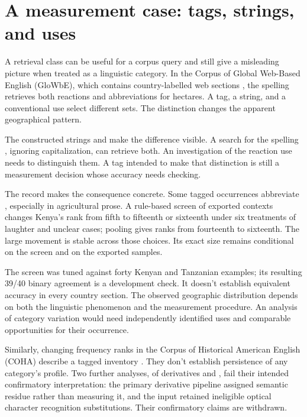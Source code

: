 \documentclass[12pt]{article}
\begin{document}
\section{A measurement case: tags, strings, and uses}\label{sec:evidence}

A retrieval class can be useful for a corpus query and still give
a misleading picture when treated as a linguistic category. In the
Corpus of Global Web-Based English (GloWbE), which contains country-labelled
web sections \citep{daviesfuchs2015}, the spelling  retrieves
both reactions and abbreviations for hectares. A tag, a string, and
a conventional use select different sets. The distinction changes the
apparent geographical pattern.

The constructed strings  and  make the difference visible. A search for the spelling
, ignoring capitalization, can retrieve both. An investigation
of the reaction use needs to distinguish them. A tag intended to
make that distinction is still a measurement decision whose accuracy
needs checking.

The  record makes the consequence concrete. Some tagged
occurrences abbreviate , especially in agricultural prose.
A rule-based screen of exported contexts changes Kenya's rank from fifth
to fifteenth or sixteenth under six treatments of laughter and unclear
cases; pooling gives ranks from fourteenth to sixteenth. The large
movement is stable across those choices. Its exact size remains
conditional on the screen and on the exported samples.

The screen was tuned against forty Kenyan and Tanzanian examples;
its resulting 39/40 binary agreement is a development check. It doesn't
establish equivalent accuracy in every country section. The observed
geographic distribution depends on both the linguistic
phenomenon and the measurement procedure. An analysis of category
variation would need independently identified uses and comparable
opportunities for their occurrence.

Similarly, changing frequency ranks in the Corpus of Historical American
English (COHA) describe a tagged inventory \citep{davies2010}.
They don't establish persistence of any category's profile.
Two further analyses, of derivatives and , fail their
intended confirmatory interpretation: the primary derivative pipeline
assigned semantic residue rather than measuring it, and the 
input retained ineligible optical character recognition substitutions.
Their confirmatory claims are withdrawn.
\end{document}
